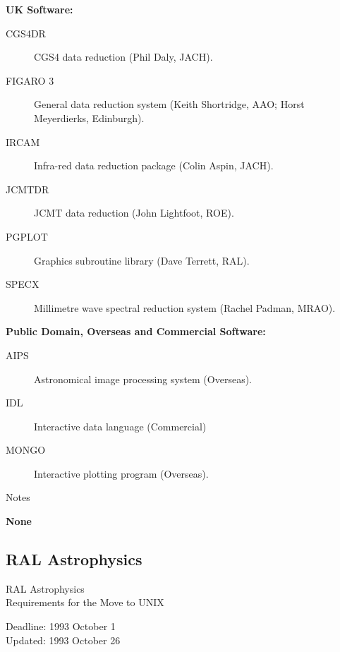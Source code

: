 \begin{center}
{\bf UK Software:}
\end{center}

\begin{description}
\item[CGS4DR] CGS4 data reduction (Phil Daly, JACH).
\item[FIGARO 3] General data reduction system (Keith Shortridge, AAO; Horst
Meyerdierks, Edinburgh).
\item[IRCAM] Infra-red data reduction package (Colin Aspin, JACH).
\item[JCMTDR] JCMT data reduction (John Lightfoot, ROE).
\item[PGPLOT] Graphics subroutine library (Dave Terrett, RAL).
\item[SPECX] Millimetre wave spectral reduction system (Rachel Padman, MRAO).
\end{description}


\vspace{5mm}
\begin{center}
{\bf Public Domain, Overseas and Commercial Software:}
\end{center}

\begin{description}
\item[AIPS] Astronomical image processing system (Overseas).
\item[IDL] Interactive data language (Commercial)
\item[MONGO] Interactive plotting program (Overseas).
\end{description}


\vspace{5mm}
\begin{center}
{\large\sc Notes}
\end{center}

{\bf None}


\newpage
\subsection{RAL Astrophysics}

\renewcommand{\starsitename}{RAL Astrophysics}
\renewcommand{\starnodename}{RLSAC}

\renewcommand{\starunixdate}{1993 October 1}
\renewcommand{\starupdate}{1993 October 26}

\renewcommand{\starsitetelephone}{0235 821900 Ext. 6497}
\renewcommand{\starsitefax}{0235 445848}

\begin{center}
{\Large\sc \starsitename \\ [2ex]
           Requirements for the Move to UNIX}

\vspace{3mm}
{\large\sc Deadline: \starunixdate \\ [1ex]
           Updated: \starupdate}
\end{center}

